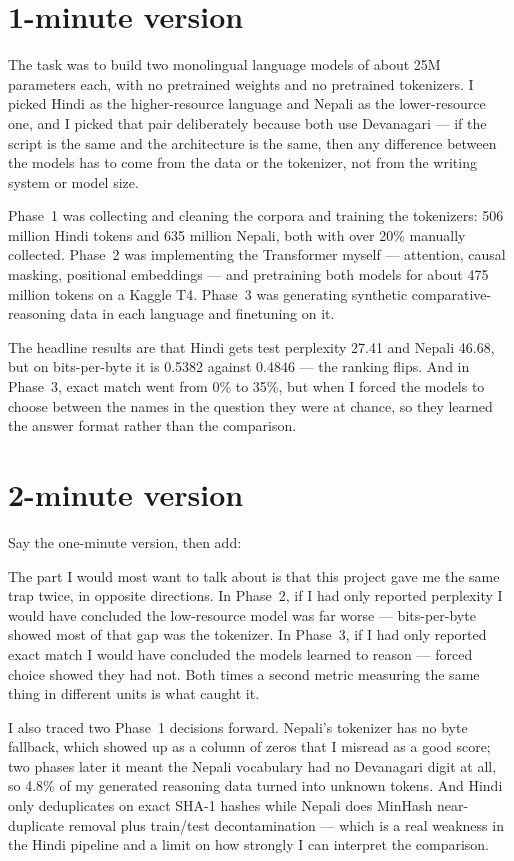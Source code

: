 \documentclass[11pt]{report}
\begin{document}
\section{1-minute version}

\begin{sayit}
The task was to build two monolingual language models of about 25M parameters
each, with no pretrained weights and no pretrained tokenizers. I picked Hindi
as the higher-resource language and Nepali as the lower-resource one, and I
picked that pair deliberately because both use Devanagari --- if the script is
the same and the architecture is the same, then any difference between the
models has to come from the data or the tokenizer, not from the writing system
or model size.

\smallskip
Phase~1 was collecting and cleaning the corpora and training the tokenizers:
506 million Hindi tokens and 635 million Nepali, both with over 20\% manually
collected. Phase~2 was implementing the Transformer myself --- attention,
causal masking, positional embeddings --- and pretraining both models for about
475 million tokens on a Kaggle T4. Phase~3 was generating synthetic
comparative-reasoning data in each language and finetuning on it.

\smallskip
The headline results are that Hindi gets test perplexity 27.41 and Nepali
46.68, but on bits-per-byte it is 0.5382 against 0.4846 --- the ranking flips.
And in Phase~3, exact match went from 0\% to 35\%, but when I forced the models
to choose between the names in the question they were at chance, so they
learned the answer format rather than the comparison.
\end{sayit}

\section{2-minute version}

Say the one-minute version, then add:

\begin{sayit}
The part I would most want to talk about is that this project gave me the same
trap twice, in opposite directions. In Phase~2, if I had only reported
perplexity I would have concluded the low-resource model was far worse ---
bits-per-byte showed most of that gap was the tokenizer. In Phase~3, if I had
only reported exact match I would have concluded the models learned to reason
--- forced choice showed they had not. Both times a second metric measuring the
same thing in different units is what caught it.

\smallskip
I also traced two Phase~1 decisions forward. Nepali's tokenizer has no byte
fallback, which showed up as a column of zeros that I misread as a good score;
two phases later it meant the Nepali vocabulary had no Devanagari digit at all,
so 4.8\% of my generated reasoning data turned into unknown tokens. And Hindi
only deduplicates on exact SHA-1 hashes while Nepali does MinHash
near-duplicate removal plus train/test decontamination --- which is a real
weakness in the Hindi pipeline and a limit on how strongly I can interpret the
comparison.
\end{sayit}
\end{document}

